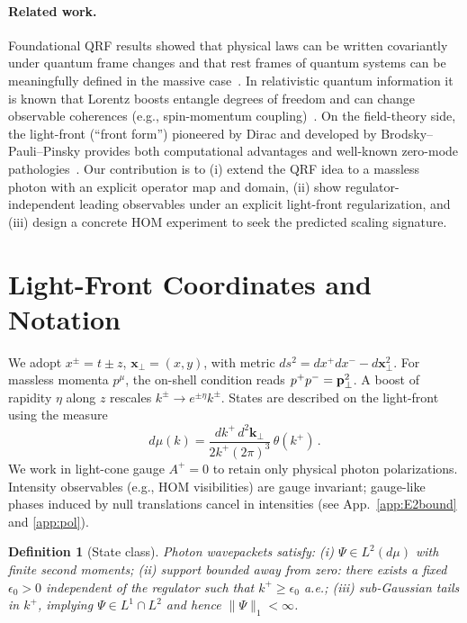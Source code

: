 \documentclass[aps,11pt]{article}
\newcommand{\kplus}{k^{+}}
\newcommand{\kperp}{\mathbf{k}_{\perp}}
\newtheorem{definition}{Definition}
\begin{document}
\paragraph{Related work.}
Foundational QRF results showed that physical laws can be written covariantly under quantum frame changes and that rest frames of quantum systems can be meaningfully defined in the massive case~\cite{Giacomini2019,Vanrietvelde2020}. In relativistic quantum information it is known that Lorentz boosts entangle degrees of freedom and can change observable coherences (e.g., spin-momentum coupling)~\cite{PeresTerno2002,Streiter2021}. On the field-theory side, the light-front (``front form'') pioneered by Dirac and developed by Brodsky--Pauli--Pinsky provides both computational advantages and well-known zero-mode pathologies~\cite{Dirac1949,Brodsky1998}. Our contribution is to (i) extend the QRF idea to a massless photon with an explicit operator map and domain, (ii) show regulator-independent leading observables under an explicit light-front regularization, and (iii) design a concrete HOM experiment to seek the predicted scaling signature.

\section{Light-Front Coordinates and Notation}\label{sec:lightfront_primer}
We adopt \(x^\pm=t\pm z\), \(\mathbf{x}_\perp=(x,y)\), with metric \(ds^2=dx^+dx^--d\mathbf{x}_\perp^2\). For massless momenta \(p^\mu\), the on-shell condition reads \(p^+p^-=\vb{p}_\perp^2\). A boost of rapidity \(\eta\) along \(z\) rescales \(k^\pm\to e^{\pm\eta}k^\pm\). States are described on the light-front using the measure
\begin{equation}
d\mu(k)= \frac{d\kplus\, d^2\kperp}{2\kplus(2\pi)^3}\, \theta(\kplus)\,.
\end{equation}
We work in light-cone gauge \(A^+=0\) to retain only physical photon polarizations. Intensity observables (e.g., HOM visibilities) are gauge invariant; gauge-like phases induced by null translations cancel in intensities (see App.~\ref{app:E2bound} and \ref{app:pol}).

\begin{definition}[State class]\label{def:stateclass}
Photon wavepackets satisfy: (i) \(\Psi\in L^2(d\mu)\) with finite second moments; (ii) support bounded away from zero: there exists a fixed \(\epsilon_0>0\) \emph{independent of the regulator} such that \(\kplus\ge \epsilon_0\) a.e.; (iii) sub-Gaussian tails in \(\kplus\), implying \(\Psi\in L^1\cap L^2\) and hence \(\|\Psi\|_1<\infty\).
\end{definition}
\end{document}
